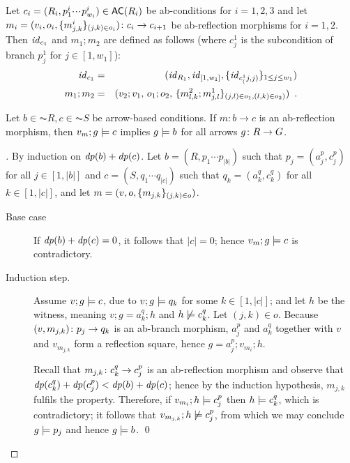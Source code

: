 \begin{definition}\label{def:ab-reflection composition}
Let $c_i=(R_i,p^i_1\ccdots p^i_{w_i})\in \AC{R_i}$ be ab-conditions for $i=1,2,3$ and let $m_i=(v_i,o_i,\{{m^i_{j,k}}\}_{(j,k)\in o_i}) \colon c_i\rightarrow c_{i+1}$ be ab-reflection morphisms for $i=1,2$. Then $\mathit{id}_{c_1}$ and $m_1;m_2$ are defined as follows (where $c^1_j$ is the subcondition of branch $p^1_j$ for $j\in [1,w_1]$):
%
\begin{eqnarray}
\mathit{id}_{c_1} & =
  & (\mathit{id}_{R_1},\mathit{id}_{[1,w_1]},\{{\mathit{id}_{c^1_(j,j)}}\}_{1\leq j\leq w_1})
  \label{eq:id condition morphism} \\
m_1;m_2 & =
  & (v_2;v_1,\, o_1;o_2,\, \{{m^2_{l,k};m^1_{j,l}}\}_{(j,l)\in o_1,(l,k)\in o_2)}) \enspace.
 \label{eq:condition morphism composition}
\end{eqnarray}
\end{definition}

\begin{proposition}
  \label{preop:ab-reflection morphisms}
Let $b\in \AC R,c \in \AC{S}$ be arrow-based conditions. If $m:b\to c$ is an ab-reflection morphism, then $v_m;g\models c$ implies $g \models b$ for all arrows $g\colon R\rightarrow G$. 
\end{proposition}

\begin{proof}[]
By induction on $\mathit{dp}(b)+\mathit{dp}(c)$. Let $b=(R,p_1\cdots p_{|b|})$ such that $p_j=(a^p_j,c^p_j)$ for all $j\in[1,|b|]$ and $c=(S,q_1\cdots q_{|c|})$ such that $q_k=(a^q_k,c^q_k)$ for all $k\in[1,|c|]$, and let $m=(v,o,\{{m_{j,k}}\}_{(j,k)\in o})$.
\begin{description}
\item[Base case] If $\mathit{dp}(b)+\mathit{dp}(c)=0$, it follows that $|c|=0$; hence $v_m;g\models c$ is contradictory.
\item[Induction step.] Assume $v;g\models c$, due to $v;g\models q_k$ for some $k\in [1,|c|]$; and let $h$ be the witness, meaning $v;g=a^q_k;h$ and $h\not\models c^q_k$. Let $(j,k)\in o$. Because $(v,m_{j,k})\colon p_j\rightarrow q_k$ is an ab-branch morphism, $a^p_j$ and $a^q_k$ together with $v$ and $v_{m_{j,k}}$ form a reflection square, hence $g=a^p_j;v_{m_i};h$.

\smallskip
Recall that $m_{j,k}\colon c^q_k\rightarrow c^p_j$ is an ab-reflection morphism and observe that $\mathit{dp}(c^q_k)+\mathit{dp}(c^p_j) < \mathit{dp}(b)+\mathit{dp}(c)$; hence by the induction hypothesis, $m_{j,k}$ fulfils the property. Therefore, if $v_{m_i};h\models c^p_j$ then $h\models c^q_k$, which is contradictory; it follows that $v_{m_{j,k}};h\not\models c^p_j$, from which we may conclude $g\models p_j$ and hence $g\models b$. \qed
\end{description}
\end{proof}


